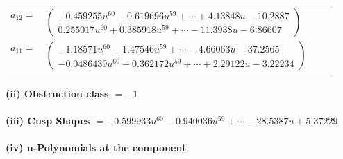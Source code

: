 \documentclass[1p]{elsarticle_modified}
\theoremstyle{definition}
\begin{document}
\begin{tabular}{m{7pt} m{180pt} m{7pt} m{180pt} }
\flushright $a_{12}=$&$\begin{pmatrix}-0.459255 u^{60}-0.619696 u^{59}+\cdots+4.13848 u-10.2887\\0.255017 u^{60}+0.385918 u^{59}+\cdots-11.3938 u-6.86607\end{pmatrix}$ \\
\flushright $a_{11}=$&$\begin{pmatrix}-1.18571 u^{60}-1.47546 u^{59}+\cdots-4.66063 u-37.2565\\-0.0486439 u^{60}-0.362172 u^{59}+\cdots+2.29122 u-3.22234\end{pmatrix}$\\&\end{tabular}
\flushleft \textbf{(ii) Obstruction class $= -1$}\\~\\
\flushleft \textbf{(iii) Cusp Shapes $= -0.599933 u^{60}-0.940036 u^{59}+\cdots-28.5387 u+5.37229$}\\~\\
\newpage\renewcommand{\arraystretch}{1}
\flushleft \textbf{(iv) u-Polynomials at the component}\newline \\
\end{document}

